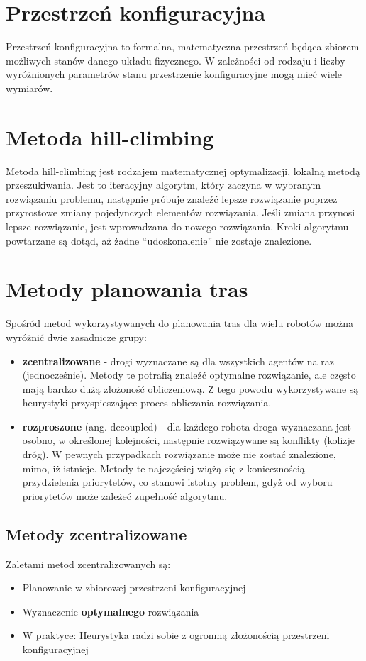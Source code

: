 \section{Przestrzeń konfiguracyjna}
Przestrzeń konfiguracyjna to formalna, matematyczna przestrzeń będąca zbiorem możliwych stanów danego układu fizycznego.
W zależności od rodzaju i liczby wyróżnionych parametrów stanu przestrzenie konfiguracyjne mogą mieć wiele wymiarów.

\section{Metoda hill-climbing}
Metoda hill-climbing jest rodzajem matematycznej optymalizacji, lokalną metodą przeszukiwania.
Jest to iteracyjny algorytm, który zaczyna w wybranym rozwiązaniu problemu, następnie próbuje znaleźć lepsze rozwiązanie poprzez przyrostowe zmiany pojedynczych elementów rozwiązania.
Jeśli zmiana przynosi lepsze rozwiązanie, jest wprowadzana do nowego rozwiązania.
Kroki algorytmu powtarzane są dotąd, aż żadne ``udoskonalenie'' nie zostaje znalezione.

\section{Metody planowania tras}
Spośród metod wykorzystywanych do planowania tras dla wielu robotów można wyróżnić dwie zasadnicze grupy:
\begin{itemize}
	\item {\bf zcentralizowane} - drogi wyznaczane są dla wszystkich agentów na raz (jednocześnie). Metody te potrafią znaleźć optymalne rozwiązanie, ale często mają bardzo dużą złożoność obliczeniową. Z tego powodu wykorzystywane są heurystyki przyspieszające proces obliczania rozwiązania.
	\item {\bf rozproszone} (ang. decoupled) - dla każdego robota droga wyznaczana jest osobno, w określonej kolejności, następnie rozwiązywane są konflikty (kolizje dróg). W pewnych przypadkach rozwiązanie może nie zostać znalezione, mimo, iż istnieje. Metody te najczęściej wiążą się z koniecznością przydzielenia priorytetów, co stanowi istotny problem, gdyż od wyboru priorytetów może zależeć zupełność algorytmu.
\end{itemize}

\subsection{Metody zcentralizowane}
Zaletami metod zcentralizowanych są:
\begin{itemize}
	\item Planowanie w zbiorowej przestrzeni konfiguracyjnej
	\item Wyznaczenie {\bf optymalnego} rozwiązania
	\item W praktyce: Heurystyka radzi sobie z ogromną złożonością przestrzeni konfiguracyjnej
\end{itemize}

